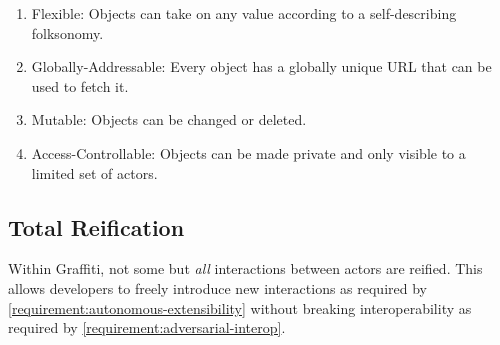 \begin{enumerate}
\item
Flexible: Objects can take on any value according to a self-describing folksonomy.
\item
Globally-Addressable: Every object has a globally unique URL that can be used to fetch it.
\item
Mutable: Objects can be changed or deleted.
\item
Access-Controllable: Objects can be made private and only visible to a limited set of actors.
\end{enumerate}


\subsection{Total Reification}
\label{concepts:total-reification}

Within Graffiti, not some but \emph{all} interactions between actors
are reified.
This allows developers to freely introduce new interactions
as required by \ref{requirement:autonomous-extensibility} without
breaking interoperability as required by \ref{requirement:adversarial-interop}.




